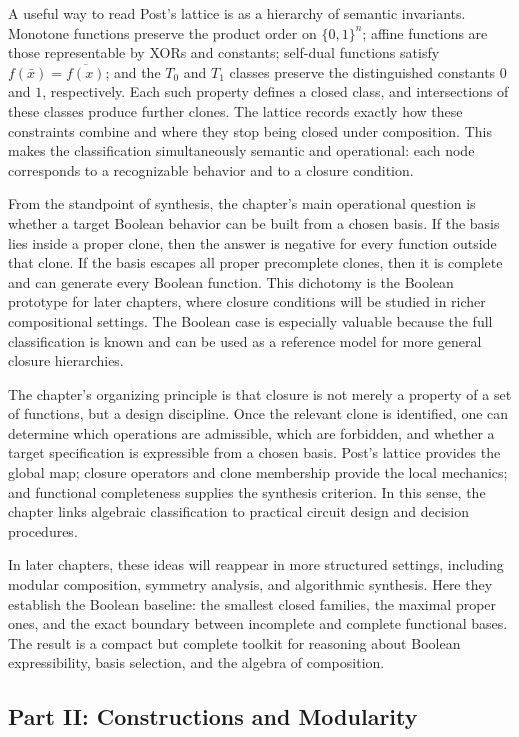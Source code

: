 \documentclass[11pt]{article}
\begin{document}
A useful way to read Post's lattice is as a hierarchy of semantic invariants. Monotone functions preserve the product order on \(\{0,1\}^n\); affine functions are those representable by XORs and constants; self-dual functions satisfy \(f(\bar{x})=\overline{f(x)}\); and the \(T_0\) and \(T_1\) classes preserve the distinguished constants \(0\) and \(1\), respectively. Each such property defines a closed class, and intersections of these classes produce further clones. The lattice records exactly how these constraints combine and where they stop being closed under composition. This makes the classification simultaneously semantic and operational: each node corresponds to a recognizable behavior and to a closure condition.

From the standpoint of synthesis, the chapter's main operational question is whether a target Boolean behavior can be built from a chosen basis. If the basis lies inside a proper clone, then the answer is negative for every function outside that clone. If the basis escapes all proper precomplete clones, then it is complete and can generate every Boolean function. This dichotomy is the Boolean prototype for later chapters, where closure conditions will be studied in richer compositional settings. The Boolean case is especially valuable because the full classification is known and can be used as a reference model for more general closure hierarchies.

The chapter's organizing principle is that closure is not merely a property of a set of functions, but a design discipline. Once the relevant clone is identified, one can determine which operations are admissible, which are forbidden, and whether a target specification is expressible from a chosen basis. Post's lattice provides the global map; closure operators and clone membership provide the local mechanics; and functional completeness supplies the synthesis criterion. In this sense, the chapter links algebraic classification to practical circuit design and decision procedures.

In later chapters, these ideas will reappear in more structured settings, including modular composition, symmetry analysis, and algorithmic synthesis. Here they establish the Boolean baseline: the smallest closed families, the maximal proper ones, and the exact boundary between incomplete and complete functional bases. The result is a compact but complete toolkit for reasoning about Boolean expressibility, basis selection, and the algebra of composition.


\subsection{Part II: Constructions and Modularity}
\end{document}
